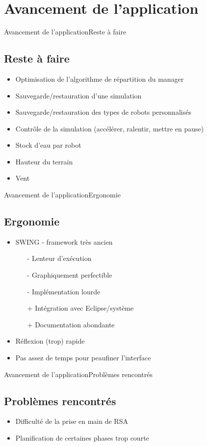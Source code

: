 \section{Avancement de l'application}
\begin{frame}{Avancement de l'application}{Reste à faire}
\subsection{Reste à faire}
\begin{itemize}
	\item Optimisation de l'algorithme de répartition du manager
	\item Sauvegarde/restauration d'une simulation
	\item Sauvegarde/restauration des types de robots personnalisés
	\item Contrôle de la simulation (accélérer, ralentir, mettre en pause)
	\item Stock d'eau par robot
	\item Hauteur du terrain
	\item Vent
\end{itemize}
\end{frame}

\begin{frame}{Avancement de l'application}{Ergonomie}
\subsection{Ergonomie}
\begin{itemize}
	\item SWING - framework très ancien
	\begin{itemize}
		\item[-] Lenteur d'exécution
		\item[-] Graphiquement perfectible
		\item[-] Implémentation lourde
		\item[+] Intégration avec Eclipse/système
		\item[+] Documentation abondante
	\end{itemize}
	\item Réflexion (trop) rapide
	\item Pas assez de temps pour peaufiner l'interface
\end{itemize}
\end{frame}

\begin{frame}{Avancement de l'application}{Problèmes rencontrés}
\subsection{Problèmes rencontrés}
\begin{itemize}
	\item Difficulté de la prise en main de RSA
	\item Planification de certaines phases trop courte
\end{itemize}
\end{frame}

